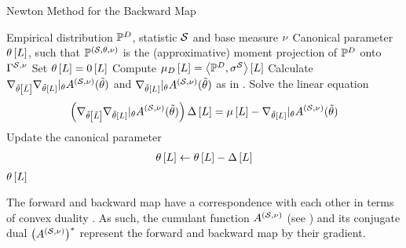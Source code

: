 \begin{algorithm}
    \caption{Newton Method for the Backward Map}\label{alg:newtonBackward}
    \begin{algorithmic}
        \Require Empirical distribution $\mathbb{P}^{D}$, statistic $\mathcal{S}$ and base measure $\nu$
        \Ensure Canonical parameter $\theta\left[L\right]$, such that $\mathbb{P}^{(\mathcal{S},\theta,\nu)}$ is the (approximative) moment projection of $\mathbb{P}^{D}$ onto $\Gamma^{\mathcal{S},\nu}$
        \iosepline
        \State Set $\theta\left[L\right]=0\left[L\right]$
        \State Compute $\mu_{D}\left[L\right]= \left\langle \mathbb{P}^{D},\sigma^{\mathcal{S}}\right\rangle \left[ L \right]$
            \State Calculate $\nabla_{\tilde{\theta}\left[\tilde{L}\right]}\nabla_{\tilde{\theta}\left[L\right]}|_{\theta} A^{(\mathcal{S},\nu)}(\tilde{\theta})$ and  $\nabla_{\tilde{\theta}\left[L\right]}|_{\theta} A^{(\mathcal{S},\nu)}(\tilde{\theta})$ as in . %
            \State Solve the linear equation
            \begin{align*}
                \left(\nabla_{\tilde{\theta}\left[\tilde{L}\right]}\nabla_{\tilde{\theta}\left[L\right]}|_{\theta} A^{(\mathcal{S},\nu)}(\tilde{\theta})\right)  \Delta\left[L\right]
                = \mu\left[L\right] - \nabla_{\tilde{\theta}\left[L\right]}|_{\theta} A^{(\mathcal{S},\nu)}(\tilde{\theta})
            \end{align*}
            \State Update the canonical parameter
            \begin{align*}
                \theta\left[L\right] \leftarrow \theta\left[L\right] - \Delta\left[L\right]
            \end{align*}
        \EndWhile
        \State \Return $\theta\left[L\right]$
    \end{algorithmic}
\end{algorithm}



%

The forward and backward map have a correspondence with each other in terms of convex duality \cite{rockafellar_convex_1997}.
As such, the cumulant function $A^{(\mathcal{S},\nu)}$ (see ) and its conjugate dual $\big(A^{(\mathcal{S},\nu)}\big)^*$ represent the forward and backward map by their gradient.

